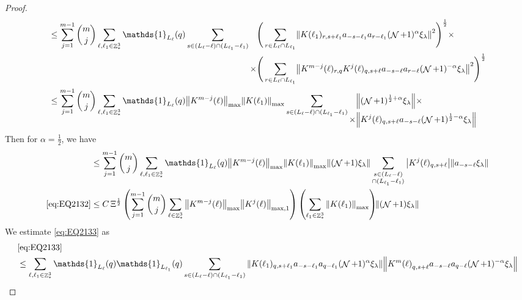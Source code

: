 \documentclass[12pt,a4paper]{article}
\numberwithin{equation}{section}
\newcommand{\1}{\mathbb{I}}
\DeclareMathOperator{\Z}{\mathbb{Z}}
\DeclareMathOperator{\NN}{\mathcal{N}}
\newcommand{\half}{\frac{1}{2}}
\theoremstyle{plain}
\theoremstyle{definition}
\theoremstyle{remark}
\theoremstyle{plain}
\theoremstyle{definition}
\theoremstyle{remark}
\begin{document}
\begin{proof}
\begin{align}
    &\leq \sum\limits_{j=1}^{m-1} {{m}\choose j} \sum\limits_{\ell, \ell_1\in \Z^3_*} \mathds{1}_{L_{\ell}}(q) \sum\limits_{ s \in (L_{\ell}-\ell) \cap (L_{\ell_1}-\ell_1)}   \begin{aligned}[t] \Bigg(\sum\limits_{r\in L_{\ell} \cap L_{\ell_1}} &\norm{ K(\ell_1)_{r,s+\ell_1}a_{-s-\ell_1} a_{r-\ell_1} (\NN+1)^{\alpha}\xi_\lambda}^2\Bigg)^\half\nonumber \times \\ \times\Bigg(  \sum\limits_{ r\in L_{\ell} \cap L_{\ell_1}}&\norm{ K^{m-j}(\ell)_{r,q} K^{j}(\ell)_{q,s+\ell} a_{-s-\ell}a_{r-\ell} (\NN+1)^{-\alpha} \xi_\lambda }^2\Bigg)^\half\end{aligned} \nonumber\\
    &\leq \sum\limits_{j=1}^{m-1} {{m}\choose j} \sum\limits_{\ell, \ell_1\in \Z^3_*} \mathds{1}_{L_{\ell}}(q) \norm{K^{m-j}(\ell)}_{\max} \norm{ K(\ell_1)}_{\max} \sum\limits_{ s \in (L_{\ell}-\ell) \cap (L_{\ell_1}-\ell_1)} \begin{aligned}[t] &\norm{(\NN+1)^{\half+\alpha}\xi_\lambda}\nonumber \times \\ \times&\norm{  K^{j}(\ell)_{q,s+\ell}  a_{-s-\ell} (\NN+1)^{\half-\alpha} \xi_\lambda }\end{aligned} \nonumber
\end{align} 
Then for $\alpha = \half$, we have
\begin{align}
	&\leq \sum\limits_{j=1}^{m-1} {{m}\choose j} \sum\limits_{\ell, \ell_1\in \Z^3_*} \mathds{1}_{L_{\ell}}(q) \norm{K^{m-j}(\ell)}_{\max} \norm{ K(\ell_1)}_{\max} \norm{(\NN+1)\xi_\lambda}\sum\limits_{ \substack{s \in (L_{\ell}-\ell) \\ \cap (L_{\ell_1}-\ell_1)}} \abs{K^{j}(\ell)_{q,s+\ell}} \norm{ a_{-s-\ell}  \xi_\lambda }\nonumber\\
	\eqref{eq:EQ2132} &\leq  C \, \Xi^\half \left(  \sum\limits_{j=1}^{m-1} {{m}\choose j} \sum\limits_{\ell \in \Z^3_*} \norm{K^{m-j}(\ell)}_{\max} \norm{ K^{j}(\ell)}_{\mathrm{max,1}}\right) \left( \sum\limits_{ \ell_1\in \Z^3_*}\norm{ K(\ell_1) }_{\max} \right)\!\! \norm{(\NN+1) \xi_\lambda }\label{eq:estEQ2132}
\end{align}
We estimate \eqref{eq:EQ2133} as
\begin{align}
    &\eqref{eq:EQ2133}\nonumber\\
    &\leq \sum\limits_{\ell, \ell_1\in \Z^3_*} \mathds{1}_{L_{\ell}}(q) \mathds{1}_{L_{\ell_1}}(q) \sum\limits_{ s \in (L_{\ell}-\ell) \cap (L_{\ell_1}-\ell_1)} \norm{K(\ell_1)_{q,s+\ell_1} a_{-s-\ell_1} a_{q-\ell_1}  (\NN+1)^{\alpha}\xi_\lambda}\norm{ K^m{(\ell)}_{q,s+\ell}  a_{-s-\ell} a_{q-\ell} (\NN+1)^{-\alpha} \xi_\lambda } \nonumber\\

\end{align}
\end{proof}
\end{document}
